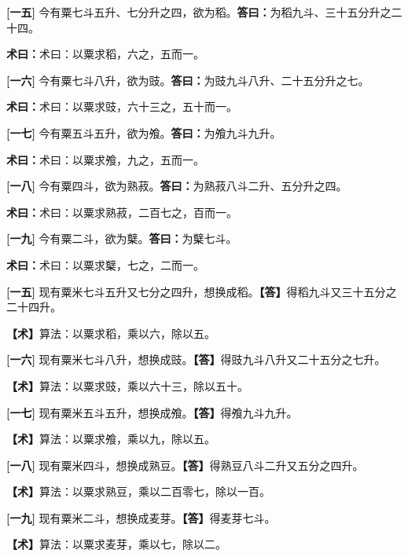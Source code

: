 \documentclass[10pt,a4paper]{article}
\newlength{\lw}
\newlength{\rw}
\newcommand{\bilingc}[2]{%
  \par\vspace{0.1em}%
  \noindent\begin{minipage}[t]{\lw}
  {\small #1}
  \end{minipage}%
  \hfill%
  \begin{minipage}[t]{\rw}
  {\small #2}
  \end{minipage}%
  \vspace{0.1em}%
}
\newcommand{\da}{\textbf{\textcolor{answercolor}{答曰：}}}
\newcommand{\daB}{\textbf{\textcolor{answercolor}{【答】}}}
\newcommand{\shu}{\textbf{\textcolor{methodcolor}{术曰：}}}
\newcommand{\shuB}{\textbf{\textcolor{methodcolor}{【术】}}}
\newcommand{\pn}[1]{\textbf{[#1]}}
\begin{document}
\bilingc{
\pn{一五} 今有粟七斗五升、七分升之四，欲为稻。\quad\da 为稻九斗、三十五分升之二十四。

\shu 术曰：以粟求稻，六之，五而一。

\pn{一六} 今有粟七斗八升，欲为豉。\quad\da 为豉九斗八升、二十五分升之七。

\shu 术曰：以粟求豉，六十三之，五十而一。

\pn{一七} 今有粟五斗五升，欲为飧。\quad\da 为飧九斗九升。

\shu 术曰：以粟求飧，九之，五而一。

\pn{一八} 今有粟四斗，欲为熟菽。\quad\da 为熟菽八斗二升、五分升之四。

\shu 术曰：以粟求熟菽，二百七之，百而一。

\pn{一九} 今有粟二斗，欲为櫱。\quad\da 为櫱七斗。

\shu 术曰：以粟求櫱，七之，二而一。
}{
\pn{一五} 现有粟米七斗五升又七分之四升，想换成稻。\quad\daB 得稻九斗又三十五分之二十四升。

\shuB 算法：以粟求稻，乘以六，除以五。

\pn{一六} 现有粟米七斗八升，想换成豉。\quad\daB 得豉九斗八升又二十五分之七升。

\shuB 算法：以粟求豉，乘以六十三，除以五十。

\pn{一七} 现有粟米五斗五升，想换成飧。\quad\daB 得飧九斗九升。

\shuB 算法：以粟求飧，乘以九，除以五。

\pn{一八} 现有粟米四斗，想换成熟豆。\quad\daB 得熟豆八斗二升又五分之四升。

\shuB 算法：以粟求熟豆，乘以二百零七，除以一百。

\pn{一九} 现有粟米二斗，想换成麦芽。\quad\daB 得麦芽七斗。

\shuB 算法：以粟求麦芽，乘以七，除以二。
}

\vspace{0.3em}
\end{document}
